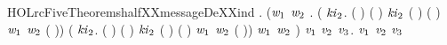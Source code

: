 \begin{SaveVerbatim}{HOLrcFiveTheoremshalfXXmessageDeXXind}
\HOLTokenTurnstile{} \HOLSymConst{\HOLTokenForall{}}. (\HOLSymConst{\HOLTokenForall{}}\ensuremath{\HOLBoundVar{w}\sb{\mathrm{1}}} \ensuremath{\HOLBoundVar{w}\sb{\mathrm{2}}}  .
          (\HOLSymConst{\HOLTokenForall{}} \ensuremath{\HOLBoundVar{ki}\sb{\mathrm{2}}}.
              \HOLSymConst{=}  ( \HOLSymConst{\ensuremath{-}} ) ( ) \HOLSymConst{\HOLTokenConj{}}
             \ensuremath{\HOLBoundVar{ki}\sb{\mathrm{2}}} \HOLSymConst{=}  ( \HOLSymConst{\ensuremath{-}} ) ( ) \HOLSymConst{\HOLTokenConj{}}  \HOLSymConst{\HOLTokenNotEqual{}}  \HOLSymConst{\HOLTokenConj{}}  \HOLSymConst{\HOLTokenNotEqual{}}  \HOLSymConst{\HOLTokenImp{}}
              \ensuremath{\HOLBoundVar{w}\sb{\mathrm{1}}} \ensuremath{\HOLBoundVar{w}\sb{\mathrm{2}}}  ( \HOLSymConst{\ensuremath{-}} )) \HOLSymConst{\HOLTokenConj{}}
          (\HOLSymConst{\HOLTokenForall{}} \ensuremath{\HOLBoundVar{ki}\sb{\mathrm{2}}}.
              \HOLSymConst{=}  ( \HOLSymConst{\ensuremath{-}} ) ( ) \HOLSymConst{\HOLTokenConj{}}
             \ensuremath{\HOLBoundVar{ki}\sb{\mathrm{2}}} \HOLSymConst{=}  ( \HOLSymConst{\ensuremath{-}} ) ( ) \HOLSymConst{\HOLTokenConj{}}  \HOLSymConst{\HOLTokenNotEqual{}}  \HOLSymConst{\HOLTokenConj{}}  \HOLSymConst{\HOLTokenNotEqual{}}  \HOLSymConst{\HOLTokenImp{}}
              \ensuremath{\HOLBoundVar{w}\sb{\mathrm{1}}} \ensuremath{\HOLBoundVar{w}\sb{\mathrm{2}}}  ( \HOLSymConst{\ensuremath{-}} )) \HOLSymConst{\HOLTokenImp{}}
           \ensuremath{\HOLBoundVar{w}\sb{\mathrm{1}}} \ensuremath{\HOLBoundVar{w}\sb{\mathrm{2}}}  ) \HOLSymConst{\HOLTokenImp{}}
       \HOLSymConst{\HOLTokenForall{}} \ensuremath{\HOLBoundVar{v}\sb{\mathrm{1}}} \ensuremath{\HOLBoundVar{v}\sb{\mathrm{2}}} \ensuremath{\HOLBoundVar{v}\sb{\mathrm{3}}}.   \ensuremath{\HOLBoundVar{v}\sb{\mathrm{1}}} \ensuremath{\HOLBoundVar{v}\sb{\mathrm{2}}} \ensuremath{\HOLBoundVar{v}\sb{\mathrm{3}}}
\end{SaveVerbatim}

